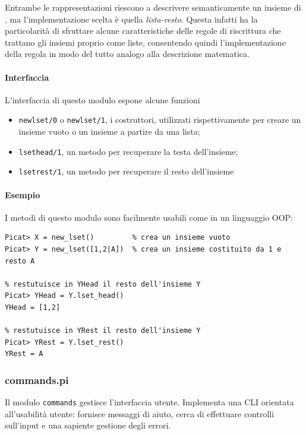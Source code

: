 \documentclass[12pt,a4paper,openright]{book} %
\begin{document}
Entrambe le rappresentazioni riescono a descrivere semanticamente un
insieme di \lset{}, ma l'implementazione scelta è quella
\emph{lista-resto}. Questa infatti ha la particolarità di sfruttare
alcune caratteristiche delle regole di riscrittura che trattano gli
insiemi proprio come liste, consentendo quindi l'implementazione della
regola in modo del tutto analogo alla descrizione matematica.

\paragraph{Interfaccia}

L'interfaccia di questo modulo espone alcune funzioni
\begin{itemize}
	\item \texttt{new\textunderscore lset/0} o
          \texttt{new\textunderscore lset/1}, i costruttori,
          utilizzati rispettivamente per creare un insieme vuoto o un
          insieme a partire da una lista;
	\item \texttt{lset\textunderscore head/1}, un metodo per
          recuperare la testa dell'insieme;
	\item \texttt{lset\textunderscore rest/1}, un metodo per
          recuperare il resto dell'insieme
\end{itemize}

\paragraph{Esempio}

I metodi di questo modulo sono facilmente usabili come in un
linguaggio OOP:
\begin{verbatim}
Picat> X = new_lset()         % crea un insieme vuoto
Picat> Y = new_lset([1,2|A])  % crea un insieme costituito da 1 e resto A

% restutuisce in YHead il resto dell'insieme Y
Picat> YHead = Y.lset_head()
YHead = [1,2]

% restutuisce in YRest il resto dell'insieme Y
Picat> YRest = Y.lset_rest()
YRest = A
\end{verbatim}


\subsubsection{commands.pi}

Il modulo \texttt{commands} gestisce l'interfaccia utente. Implementa
una CLI orientata all'usabilità utente: fornisce messaggi di aiuto,
cerca di effettuare controlli sull'input e una sapiente gestione degli
errori.
\end{document}
